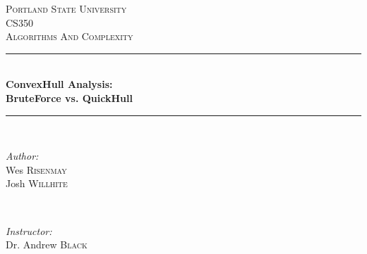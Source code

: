 \begin{titlepage}

\newcommand{\HRule}{\rule{\linewidth}{0.5mm}} %
\vspace*{40mm}
\center %
 

 \textsc{\LARGE Portland State University}\\[1.5cm] %
 \textsc{\Large CS350 }\\[0.5cm] %
 \textsc{\large Algorithms And Complexity}\\[0.5cm] %


 \HRule \\[0.4cm]
 { \huge \bfseries ConvexHull Analysis:\\ BruteForce vs. QuickHull}\\[0.4cm] %
 \HRule \\[1.5cm]
  

  \begin{minipage}{0.4\textwidth}
  \begin{flushleft} \large
  \emph{Author:}\\
  Wes \textsc{Risenmay}\\ %
  Josh \textsc{Willhite} %
  \end{flushleft}
  \end{minipage}
  ~
  \begin{minipage}{0.4\textwidth}
  \begin{flushright} \large
  \emph{Instructor:} \\
  Dr. Andrew \textsc{Black} %
  \end{flushright}
  \end{minipage}\\[4cm]


\end{titlepage}
